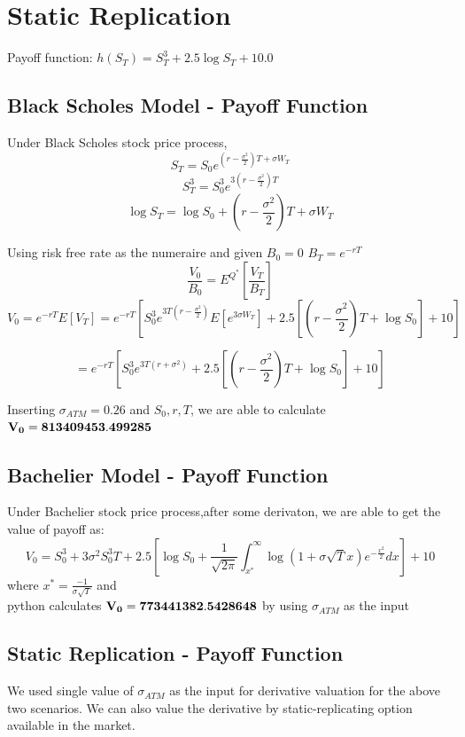 \documentclass[fleqn,12pt]{SelfArx}
\begin{document}
\section{Static Replication}

\noindent Payoff function: $h(S_T)=S_T^3+2.5\log{S_T}+10.0$

\subsection{Black Scholes Model - Payoff Function}
\noindent Under Black Scholes stock price process,
$$S_T=S_0 e^{(r-\frac{\sigma^2}{2})T+\sigma W_T}$$
$$S_T^3=S_0^3 e^{3(r-\frac{\sigma^2}{2})T}$$
$$\log{S_T}=\log{S_0}+(r-\frac{\sigma^2}{2}) T+\sigma W_T$$

\noindent Using risk free rate as the numeraire and given $B_0=0$ $B_T=e^{-rT}$
$$\frac{V_0}{B_0}=E^{Q^*}\left[\frac{V_T}{B_T}\right]$$
$$V_0=e^{-rT}E\left[V_T\right]=e^{-rT}\left[S_0^3 e^{3T(r-\frac{\sigma^2}{2})
}E\left[e^{3\sigma W_T}\right]+2.5\left[(r-\frac{\sigma^2}{2})T+\log{S_0}\right]+10\right]$$

$$=e^{-rT}\left[S_0^3 e^{3T(r+\sigma^2)}+2.5\left[(r-\frac{\sigma^2}{2})T+\log{S_0}\right]+10\right]$$

\noindent Inserting $\sigma_{ATM}=0.26$ and $S_0,r,T$, we are able to calculate $\bf{V_0=813409453.499285}$

\subsection{Bachelier Model - Payoff Function}
\noindent Under Bachelier stock price process,after some derivaton, we are able to get the value of payoff as:
$$V_0=S_0^3+3\sigma^2 S_0^3T+2.5\left[
\log{S_0}+\frac{1}{\sqrt{2\pi}}\int_{x^*}^{\infty}\log(1+\sigma \sqrt{T}x)e^{-\frac{x^2}{2}}dx\right]+10$$
\noindent where $x^*=\frac{-1}{\sigma \sqrt{T}}$ and \\
\noindent python calculates $\bf{V_0=773441382.5428648}$ by using $\sigma_{ATM}$ as the input\\

\subsection{Static Replication - Payoff Function}
\noindent We used single value of $\sigma_{ATM}$ as the input for derivative valuation for the above two scenarios. We can also value the derivative by static-replicating option available in the market.
\end{document}
